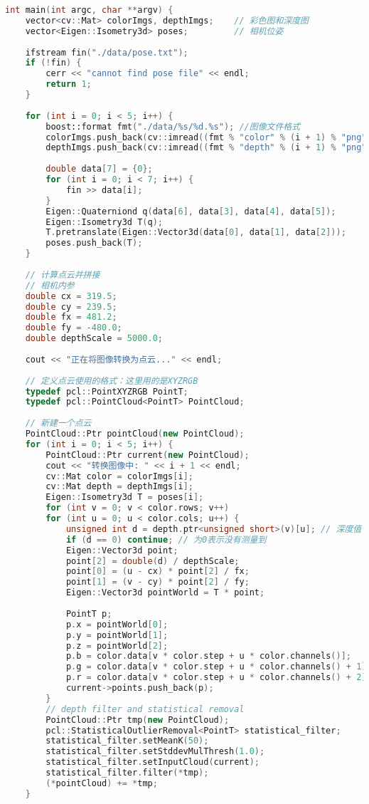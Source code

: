 \begin{lstlisting}[language=c++,caption=slambook/ch12/dense\_RGBD/pointcloud\_mapping.cpp（片段）]
int main(int argc, char **argv) {
    vector<cv::Mat> colorImgs, depthImgs;    // 彩色图和深度图
    vector<Eigen::Isometry3d> poses;         // 相机位姿
    
    ifstream fin("./data/pose.txt");
    if (!fin) {
        cerr << "cannot find pose file" << endl;
        return 1;
    }
    
    for (int i = 0; i < 5; i++) {
        boost::format fmt("./data/%s/%d.%s"); //图像文件格式
        colorImgs.push_back(cv::imread((fmt % "color" % (i + 1) % "png").str()));
        depthImgs.push_back(cv::imread((fmt % "depth" % (i + 1) % "png").str(), -1)); // 使用-1读取原始图像
        
        double data[7] = {0};
        for (int i = 0; i < 7; i++) {
            fin >> data[i];
        }
        Eigen::Quaterniond q(data[6], data[3], data[4], data[5]);
        Eigen::Isometry3d T(q);
        T.pretranslate(Eigen::Vector3d(data[0], data[1], data[2]));
        poses.push_back(T);
    }
    
    // 计算点云并拼接
    // 相机内参 
    double cx = 319.5;
    double cy = 239.5;
    double fx = 481.2;
    double fy = -480.0;
    double depthScale = 5000.0;
    
    cout << "正在将图像转换为点云..." << endl;
    
    // 定义点云使用的格式：这里用的是XYZRGB
    typedef pcl::PointXYZRGB PointT;
    typedef pcl::PointCloud<PointT> PointCloud;
    
    // 新建一个点云
    PointCloud::Ptr pointCloud(new PointCloud);
    for (int i = 0; i < 5; i++) {
        PointCloud::Ptr current(new PointCloud);
        cout << "转换图像中: " << i + 1 << endl;
        cv::Mat color = colorImgs[i];
        cv::Mat depth = depthImgs[i];
        Eigen::Isometry3d T = poses[i];
        for (int v = 0; v < color.rows; v++)
        for (int u = 0; u < color.cols; u++) {
            unsigned int d = depth.ptr<unsigned short>(v)[u]; // 深度值
            if (d == 0) continue; // 为0表示没有测量到
            Eigen::Vector3d point;
            point[2] = double(d) / depthScale;
            point[0] = (u - cx) * point[2] / fx;
            point[1] = (v - cy) * point[2] / fy;
            Eigen::Vector3d pointWorld = T * point;
            
            PointT p;
            p.x = pointWorld[0];
            p.y = pointWorld[1];
            p.z = pointWorld[2];
            p.b = color.data[v * color.step + u * color.channels()];
            p.g = color.data[v * color.step + u * color.channels() + 1];
            p.r = color.data[v * color.step + u * color.channels() + 2];
            current->points.push_back(p);
        }
        // depth filter and statistical removal 
        PointCloud::Ptr tmp(new PointCloud);
        pcl::StatisticalOutlierRemoval<PointT> statistical_filter;
        statistical_filter.setMeanK(50);
        statistical_filter.setStddevMulThresh(1.0);
        statistical_filter.setInputCloud(current);
        statistical_filter.filter(*tmp);
        (*pointCloud) += *tmp;
    }
    

\end{lstlisting}
